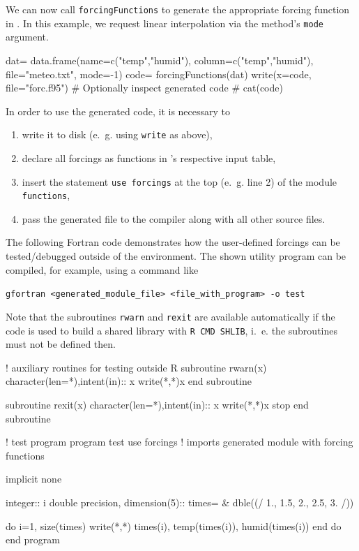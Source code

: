 \documentclass[times,onecolumn]{article}
\begin{document}
We can now call \verb|forcingFunctions| to generate the  appropriate forcing function in . In this example, we request linear interpolation via the method's \verb|mode| argument.

\begin{Schunk}
\begin{Sinput}
 dat= data.frame(name=c("temp","humid"),
   column=c("temp","humid"), file="meteo.txt", mode=-1)
 code= forcingFunctions(dat)
 write(x=code, file="forc.f95")
 # Optionally inspect generated code
 # cat(code)
\end{Sinput}
\end{Schunk}

In order to use the generated code, it is necessary to
\begin{enumerate}
\item write it to disk (e.~g. using \verb|write| as above),
\item declare all forcings as functions in 's respective input table,
\item insert the statement \verb|use forcings| at the top (e.~g. line 2) of the  module \verb|functions|,
\item pass the generated file to the compiler along with all other  source files.
\end{enumerate}

The following Fortran code demonstrates how the user-defined forcings can be tested/debugged outside of the  environment. The shown utility program can be compiled, for example, using a command like

\medskip
\verb|gfortran <generated_module_file> <file_with_program> -o test|

\medskip
Note that the subroutines \verb|rwarn| and \verb|rexit| are available automatically if the code is used to build a shared library with \verb|R CMD SHLIB|, i.~e. the subroutines must not be defined then.

\begin{shaded}
\begin{Schunk}
\begin{Soutput}
 ! auxiliary routines for testing outside R 
 subroutine rwarn(x) 
   character(len=*),intent(in):: x 
   write(*,*)x 
 end subroutine 
  
 subroutine rexit(x) 
   character(len=*),intent(in):: x 
   write(*,*)x 
   stop 
 end subroutine 
  
 ! test program 
 program test 
 use forcings  ! imports generated module with forcing functions 
  
 implicit none 
  
 integer:: i 
 double precision, dimension(5):: times= & 
   dble((/ 1., 1.5, 2., 2.5, 3. /)) 
  
 do i=1, size(times) 
   write(*,*) times(i), temp(times(i)), humid(times(i)) 
 end do 
 end program 
\end{Soutput}
\end{Schunk}
\end{shaded}
\end{document}
